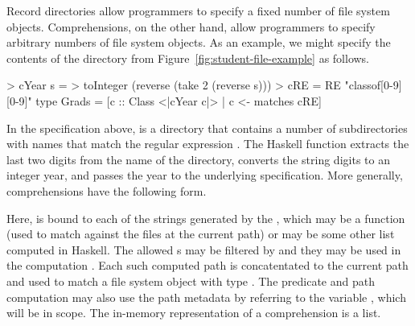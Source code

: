 \documentclass[nocopyrightspace,natbib]{sigplanconf}
\begin{document}
Record directories allow programmers to specify a fixed number of file system objects.
Comprehensions, on the other hand, allow programmers to specify arbitrary numbers
of file system objects.  As an example, we might specify the contents of the
 directory from Figure~\ref{fig:student-file-example} as follows.
\begin{code}
> cYear s = 
>   toInteger (reverse (take 2 (reverse s)))
> cRE = RE "classof[0-9][0-9]"
\mbox{}
type Grads = 
  [c :: Class <|cYear c|> | c <- matches cRE]
\end{code}
In the specification above,  is a directory that contains a number of
 subdirectories with names  that match the regular expression
.  The Haskell function  extracts the last two digits from the
name of the directory, converts the string digits to an integer year, and passes
the year to the underlying  specification.
More generally, comprehensions have the following form.
\begin{code}
\end{code}
Here,  is bound to each of the strings generated by the ,
which may be a  function (used to match against the files
at the current path) or may be some other list computed in Haskell. The allowed
s may be filtered by  and they may be used in the computation
.  Each such computed path is concatentated to the current path and
used to match a file system object with type .  The predicate and path
computation may also use the path metadata by referring to the variable
, which will be in scope.  The in-memory representation of a comprehension
is a list.
\end{document}

